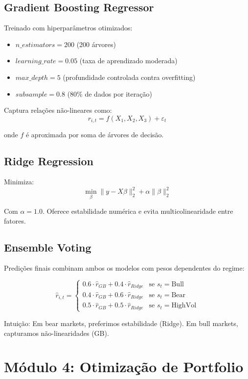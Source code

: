 \documentclass[12pt,a4paper]{article}
\begin{document}
\subsection{Gradient Boosting Regressor}

Treinado com hiperparâmetros otimizados:
\begin{itemize}
    \item $n\_estimators = 200$ (200 árvores)
    \item $learning\_rate = 0.05$ (taxa de aprendizado moderada)
    \item $max\_depth = 5$ (profundidade controlada contra overfitting)
    \item $subsample = 0.8$ (80\% de dados por iteração)
\end{itemize}

Captura relações não-lineares como:
\[
r_{i,t} = f(X_1, X_2, X_3) + \varepsilon_t
\]

onde $f$ é aproximada por soma de árvores de decisão.

\subsection{Ridge Regression}

Minimiza:
\[
\min_{\beta} \|y - X\beta\|_2^2 + \alpha \|\beta\|_2^2
\]

Com $\alpha = 1.0$. Oferece estabilidade numérica e evita multicolinearidade entre fatores.

\subsection{Ensemble Voting}

Predições finais combinam ambos os modelos com pesos dependentes do regime:

\[
\hat{r}_{i,t} = \begin{cases}
0.6 \cdot \hat{r}_{GB} + 0.4 \cdot \hat{r}_{Ridge} & \text{se } s_t = \text{Bull} \\
0.4 \cdot \hat{r}_{GB} + 0.6 \cdot \hat{r}_{Ridge} & \text{se } s_t = \text{Bear} \\
0.5 \cdot \hat{r}_{GB} + 0.5 \cdot \hat{r}_{Ridge} & \text{se } s_t = \text{HighVol}
\end{cases}
\]

Intuição: Em bear markets, preferimos estabilidade (Ridge). Em bull markets, capturamos não-linearidades (GB).

\section{Módulo 4: Otimização de Portfolio}
\end{document}
